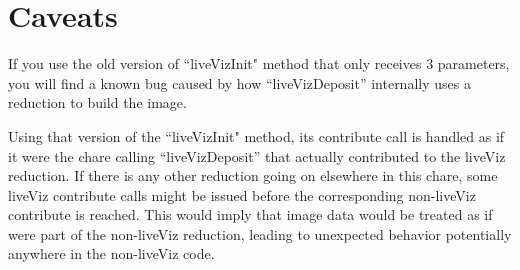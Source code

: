 \section{Caveats}
If you use the old version of ``liveVizInit" method that only receives 3 parameters, you will find a known bug caused by how ``liveVizDeposit'' internally uses a reduction to build the image.

Using that version of the ``liveVizInit" method, its contribute call is handled as if it were the chare calling ``liveVizDeposit'' that actually contributed to the liveViz reduction.
If there is any other reduction going on elsewhere in this chare, some liveViz contribute calls might be issued before the corresponding non-liveViz contribute is reached.
This would imply that image data would be treated as if were part of the non-liveViz reduction, leading to unexpected behavior potentially anywhere in the non-liveViz code.

